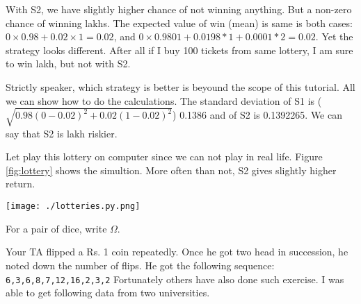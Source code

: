 \documentclass[a4paper,8pt,addpoints,solution]{exam}
\begin{document}
\begin{questions}
\begin{solution}
    With S2, we have slightly higher chance of not winning anything. But a non-zero
    chance of winning  lakhs. The expected value of win (mean) is same is
    both cases: $0 \times 0.98 + 0.02 \times 1 = 0.02$, and $0\times 0.9801 + 0.0198
    * 1 + 0.0001 * 2 = 0.02$. Yet the strategy looks different. After all if I buy
    100 tickets from same lottery, I am sure to win  lakh, but not with S2.

    Strictly speaker, which strategy is better is beyound the scope of this
    tutorial. All we can show how to do the calculations.  The standard deviation of
    S1 is ($\sqrt{0.98(0-0.02)^2+0.02(1-0.02)^2}$) 0.1386 and of S2 is
    0.1392265. We can say that S2 is  lakh riskier.

    Let play this lottery on computer since we can not play in real life.
    Figure \ref{fig:lottery} shows the simultion. More often than not, S2 gives
    slightly higher return.

    \texttt{[image: ./lotteries.py.png]}\label{fig:lottery}

\end{solution}

\question For a pair of dice, write $\Omega$.

\question[5]
Your TA flipped a Rs. 1 coin repeatedly. Once he got two head in succession,
he noted down the number of flips. He got the following sequence:
\verb|6,3,6,8,7,12,16,2,3,2| 
Fortunately others have also done such exercise. I was able to get following
data from two universities.


\end{questions}
\end{document}
